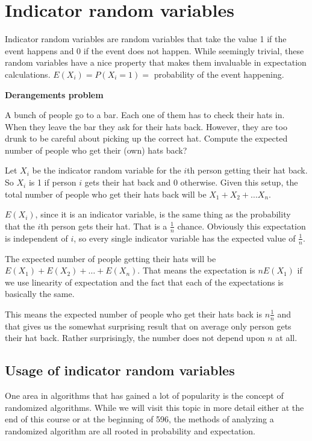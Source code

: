 \documentclass[12pt]{article}
\begin{document}
\section*{Indicator random variables}

Indicator random variables are random variables that take the value 1 if the event happens and 0 if the event does not happen. While seemingly trivial, these random variables have a nice property that makes them invaluable in expectation calculations. $E(X_i) = P(X_i=1) = $ probability of the event happening. 

\medskip

\textbf{Derangements problem}

A bunch of people go to a bar. Each one of them has to check their hats in. When they leave the bar they ask for their hats back. However, they are too drunk to be careful about picking up the correct hat. Compute the expected number of people who get their (own) hats back?

Let $X_i$ be the indicator random variable for the $i$th person getting their hat back. So $X_i$ is 1 if person $i$ gets their hat back and 0 otherwise. Given this setup, the total number of people who get their hats back will be $X_1 + X_2 + \ldots X_n$.

$E(X_i)$, since it is an indicator variable, is the same thing as the probability that the $i$th person gets their hat. That is a $\frac{1}{n}$ chance. Obviously this expectation is independent of $i$, so every single indicator variable has the expected value of $\frac{1}{n}$.

The expected number of people getting their hats will be $E(X_1) + E(X_2) + \ldots + E(X_n)$. That means the expectation is $nE(X_1)$ if we use linearity of expectation and the fact that each of the expectations is basically the same. 

This means the expected number of people who get their hats back is $n \frac{1}{n}$ and that gives us the somewhat surprising result that on average only person gets their hat back. Rather surprisingly, the number does not depend upon $n$ at all.

\subsection*{Usage of indicator random variables}
One area in algorithms that has gained a lot of popularity is the concept of randomized algorithms. While we will visit this topic in more detail either at the end of this course or at the beginning of 596, the methods of analyzing a randomized algorithm are all rooted in probability and expectation. 
\end{document}
